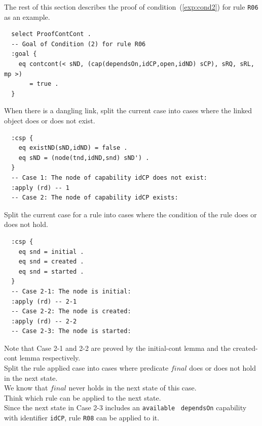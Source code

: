 \documentclass[12pt]{report}
\begin{document}
The rest of this section describes the proof of condition~(\ref{exp:cond2})
for rule {\tt R06} as an example.
\small
\begin{verbatim}
  select ProofContCont .
  -- Goal of Condition (2) for rule R06
  :goal {
    eq contcont(< sND, (cap(dependsOn,idCP,open,idND) sCP), sRQ, sRL, mp >)
       = true .
  }
\end{verbatim}
\normalsize

 When there is a dangling link, split the
current case into cases where the linked object does or does not
exist.
\small
\begin{verbatim}
  :csp {
    eq existND(sND,idND) = false .
    eq sND = (node(tnd,idND,snd) sND') .
  }
  -- Case 1: The node of capability idCP does not exist:
  :apply (rd) -- 1
  -- Case 2: The node of capability idCP exists:
\end{verbatim}
\normalsize

 Split the current case for a rule into
cases where the condition of the rule does or does not hold.
\small
\begin{verbatim}
  :csp {
    eq snd = initial .
    eq snd = created .
    eq snd = started .
  }
  -- Case 2-1: The node is initial:
  :apply (rd) -- 2-1
  -- Case 2-2: The node is created:
  :apply (rd) -- 2-2
  -- Case 2-3: The node is started:
\end{verbatim}
\normalsize
Note that Case 2-1 and 2-2 are proved by the initial-cont lemma and
the created-cont lemma respectively.\\

 Split the rule applied case into cases where
predicate $final$ does or does not hold in the next state.\\
We know that $final$ never holds in the next state of this case.\\

 Think which rule can be applied to the next
state. \\
Since the next state in Case 2-3 includes an {\tt available} {\tt
  dependsOn} capability with identifier {\tt idCP}, rule {\tt R08} can
be applied to it.\\
\end{document}
